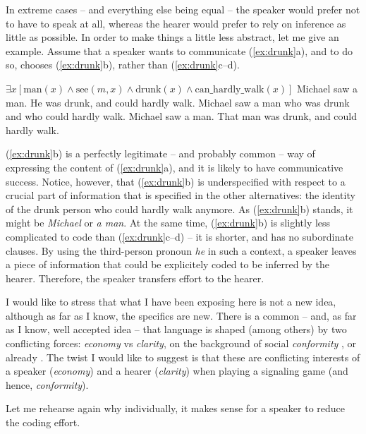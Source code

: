 \documentclass[output=paper,hidelinks]{langscibook}
\begin{document}
In extreme cases -- and everything else being equal -- the speaker would prefer not to have to speak at all, whereas the hearer would prefer to rely on inference as little as possible. In order to make things a little less abstract, let me give an example. Assume that a speaker wants to communicate (\ref{ex:drunk}a), and to do so, chooses (\ref{ex:drunk}b), rather than (\ref{ex:drunk}c--d). 

\begin{exe}
  \ex \label{ex:drunk}
  \begin{xlist}
    \ex $\exists x [\text{man}(x) \land \text{see}(m,x) \land \text{drunk}(x) \land \text{can\_hardly\_walk}(x)]$
    \ex Michael saw a man. He was drunk, and could hardly walk.
    \ex Michael saw a man who was drunk and who could hardly walk.
    \ex Michael saw a man. That man was drunk, and could hardly walk.
  \end{xlist}
\end{exe}

(\ref{ex:drunk}b) is a perfectly legitimate -- and probably common -- way of expressing the content of (\ref{ex:drunk}a), and it is likely to have communicative success.
Notice, however, that (\ref{ex:drunk}b) is underspecified with respect to a crucial part of information that is specified in the other alternatives: the identity of the drunk person who could hardly walk anymore. As (\ref{ex:drunk}b) stands, it might be \emph{Michael} or \emph{a man}. At the same time, (\ref{ex:drunk}b) is slightly less complicated to code than (\ref{ex:drunk}c--d) -- it is shorter, and has no subordinate clauses. By using the third-person pronoun \emph{he} in such a context, a speaker leaves a piece of information that could be explicitely coded to be inferred by the hearer. Therefore, the speaker transfers effort to the hearer.

I would like to stress that what I have been exposing here is not a new idea, although as far as I know, the specifics are new. There is a common -- and, as far as I know, well accepted idea -- that language is shaped (among others) by two conflicting forces: \emph{economy} vs \emph{clarity}, on the background of social \emph{conformity} \citep[see, e.g.,][]{keller94,Haspelmath1999optimality}, or already \citep[313ff.]{prinzipien}. The twist I would like to suggest is that these are conflicting interests of a speaker (\emph{economy}) and a hearer (\emph{clarity}) when playing a signaling game (and hence, \emph{conformity}).

Let me rehearse again why individually, it makes sense for a speaker to reduce the coding effort.
\end{document}

